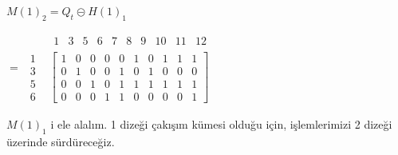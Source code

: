 \documentclass[11pt]{amsbook}
\begin{document}
$M(1)_{2} = Q_{t} \circleddash  H(1)_{1}$

\begin{center}
	$
	=
	\begin{array}{cccccccccc}
	& \begin{array}{cccccccccc}
	1& 3 & 5 & 6 & 7 & 8 & 9 & 10 & 11 & 12 
	\end{array} \\
	\begin{array}{c}
	1 \\ 3 \\ 5 \\ 6
	\end{array} &
	\left[ \begin{array}{cccccccccc}
	1 & 0 &  0 & 0 & 0 & 1 & 0 & 1 & 1 & 1 \\
	0 & 1 &  0 & 0 & 1 & 0 & 1 & 0 & 0 & 0 \\
	0 & 0 &  1 & 0 & 1 & 1 & 1 & 1 & 1 & 1 \\
	0 & 0 &  0 & 1 & 1 & 0 & 0 & 0 & 0 & 1
	\end{array} \right]
	\end{array}$
\end{center}





$M(1)_{1}$ i ele alalım. 1 dizeği çakışım kümesi olduğu için, işlemlerimizi 2 dizeği üzerinde sürdüreceğiz.



\end{document}
